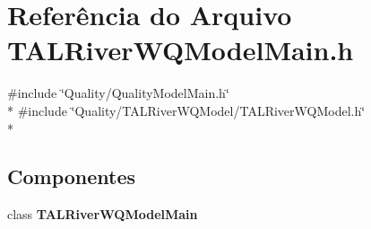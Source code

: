 \section{Referência do Arquivo T\+A\+L\+River\+W\+Q\+Model\+Main.\+h}
\label{_t_a_l_river_w_q_model_main_8h}
{\ttfamily \#include \char`\"{}Quality/\+Quality\+Model\+Main.\+h\char`\"{}}\\*
{\ttfamily \#include \char`\"{}Quality/\+T\+A\+L\+River\+W\+Q\+Model/\+T\+A\+L\+River\+W\+Q\+Model.\+h\char`\"{}}\\*
\subsection*{Componentes}
\begin{DoxyCompactItemize}
\item 
class {\bf T\+A\+L\+River\+W\+Q\+Model\+Main}
\end{DoxyCompactItemize}
